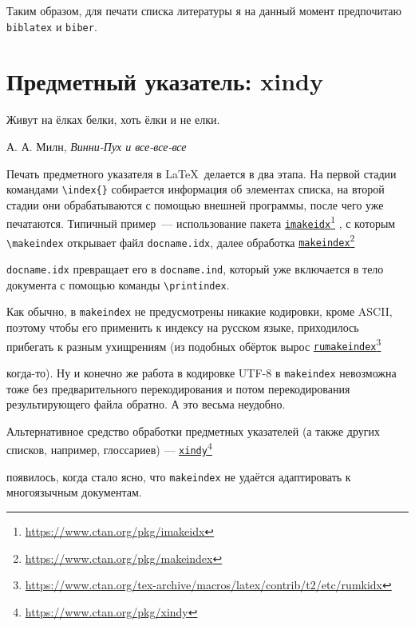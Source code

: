 \documentclass[a4paper,12pt]{article}
\let\orighref=\href
\renewcommand\href[2]{%
  \orighref{#1}{#2}\footnote{\url{#1}}%
}
\begin{document}
Таким образом, для печати списка литературы я на данный момент предпочитаю
\texttt{biblatex} и \texttt{biber}.

\section{Предметный указатель: xindy}
\epigraph{Живут на ёлках белки, хоть ёлки и не елки.}{А. А. Милн, \emph{Винни-Пух и все-все-все}}
Печать предметного указателя в \LaTeX\ делается в два этапа. На первой стадии
командами \verb|\index{}| собирается информация об элементах списка,
на второй стадии они обрабатываются с помощью внешней программы, после
чего уже печатаются. Типичный пример~--- использование пакета
\href{https://www.ctan.org/pkg/imakeidx}{\texttt{imakeidx}},
с которым \verb|\makeindex| открывает файл \texttt{docname.idx}, далее
обработка \href{https://www.ctan.org/pkg/makeindex}{\texttt{makeindex}}
\texttt{docname.idx} превращает его в \texttt{docname.ind},
который уже включается в тело документа с помощью команды \verb|\printindex|.

Как обычно, в \texttt{makeindex} не предусмотрены никакие кодировки, кроме ASCII,
поэтому чтобы его применить к индексу на русском языке, приходилось прибегать
к разным ухищрениям (из подобных обёрток вырос
\href{https://www.ctan.org/tex-archive/macros/latex/contrib/t2/etc/rumkidx}{\texttt{rumakeindex}}
когда-то). Ну и конечно
же работа в кодировке UTF-8 в \texttt{makeindex} невозможна тоже без предварительного
перекодирования и потом перекодирования результирующего файла обратно. А это
весьма неудобно.

Альтернативное средство обработки предметных указателей (а также других списков,
например, глоссариев) --- \href{https://www.ctan.org/pkg/xindy}{\texttt{xindy}}
появилось, когда стало ясно, что
\texttt{makeindex} не удаётся адаптировать к многоязычным документам.
\end{document}

